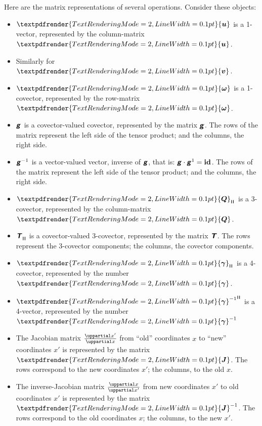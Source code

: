 \documentclass[\ifafour a4paper,12pt,\else a5paper,10pt,\fi%
onecolumn,oneside,article,%
british%
]{memoir}
\makeatletter
\theoremstyle{remark}
\theoremstyle{innote}
\newcommand*{\mathte}[1]{\textbf{\textit{\textsf{#1}}}}
\renewcommand*{\bm}[1]{\textpdfrender{TextRenderingMode=2,LineWidth=0.1pt}{\boldsymbol{#1}}}
\newcommand*{\de}{\uppartial}%
\renewcommand*{\|}[1][]{\nonscript\:#1\vert\nonscript\:\mathopen{}}
\newcommand*{\id}{\mathbf{id}}%
\renewcommand*{\i}{\indices}
\newcommand*{\q}{}%
\DeclareRobustCommand*{\q}{%
  \mathord{\mathpalette\bigcdot@{}}%
}
\newcommand*{\bigcdot@scalefactor}{0.7}
\newcommand*{\bigcdot@widthfactor}{1.5}
\newcommand*{\bigcdot@}[2]{%
  \sbox0{$#1\vcenter{}$}%
  \sbox2{$#1\cdot\m@th$}%
  \hbox to \bigcdot@widthfactor\wd2{%
    \hfil
    \raise\ht0\hbox{%
      \scalebox{\bigcdot@scalefactor}{%
        \lower\ht0\hbox{$#1\bullet\m@th$}%
      }%
    }%
    \hfil
  }%
}
\newcommand*{\rul}{{\mkern2mu\rule[-0.1ex]{0.75pt}{1.1ex}\mkern2mu}}
\DeclarePairedDelimiter\mul{\rul}{\rul}%
\newcommand*{\yg}{\mathte{g}}
\newcommand*{\ve}{\bm{\gamma}}
\newcommand*{\vi}{\bm{\gamma}^{-1}}
\newcommand*{\yQ}{\bm{Q}}
\newcommand*{\yT}{\mathte{T}}
\newcommand*{\yu}{\bm{u}}
\newcommand*{\yv}{\bm{v}}
\newcommand*{\yo}{\bm{\omega}}
\newcommand*{\yJ}{\bm{J}}
\makeatother
\begin{document}
Here are the matrix representations of several operations. Consider these objects:
\begin{itemize}
\item $\yu\i{^{\q}}$ is a 1-vector, represented by the column-matrix $\yu$.
\item Similarly for $\yv\i{^{\q}}$.
\item $\yo\i{_{\q}}$ is a 1-covector, represented by the row-matrix $\yo$.
\item $\yg\i{_{\q\q}}$ is a covector-valued covector, represented by the matrix $\yg$. The rows of the matrix represent the left side of the tensor product; and the columns, the right side.
\item ${\yg^{-1}}\i{^{\q\q}}$ is a vector-valued vector, inverse of $\yg$, that is: $\yg\cdot\yg^{1} = \id\i{_{\q}^{\q}}$. The rows of the matrix represent the left side of the tensor product; and the columns, the right side.

\item $\yQ\i{_{\mul{\q\q\q}}}$ is a 3-covector, represented by the column-matrix $\yQ$.

\item $\yT\i{_{\mul{\q\q\q}\q}}$ is a covector-valued 3-covector, represented by the matrix $\yT$. The rows represent the 3-covector components; the columns, the covector components.
\item $\ve\i{_{\mul{\q\q\q\q}}}$ is a 4-covector, represented by the number $\ve$.
\item ${\vi}\i{^{\mul{\q\q\q\q}}}$ is a 4-vector, represented by the number $\vi$
\item The Jacobian matrix $\frac{\de x'}{\de x}$ from \enquote{old} coordinates $x$ to \enquote{new} coordinates $x'$ is represented by the matrix $\yJ$. The rows correspond to the new coordinates $x'$; the columns, to the old $x$.

\item The inverse-Jacobian matrix $\frac{\de x}{\de x'}$ from new coordinates $x'$ to old coordinates $x'$ is represented by the matrix $\yJ^{-1}$. The rows correspond to the old coordinates $x$; the columns, to the new $x'$.
\end{itemize}
\end{document}
